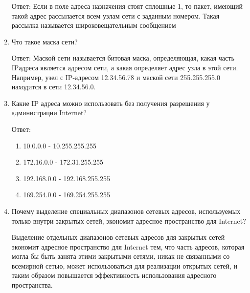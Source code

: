 \documentclass[bachelor, och, labwork]{shiza}
\begin{document}
\begin{enumerate}
        Ответ: Если в поле адреса назначения стоят сплошные 1, то пакет, имеющий такой адрес рассылается всем узлам сети с заданным номером. Такая рассылка
        называется широковещательным сообщением

        \item Что такое маска сети?

        Ответ: Маской сети называется битовая маска, определяющая, какая часть IPадреса является адресом сети, а какая определяет адрес узла в этой сети.
        Например, узел с IP-адресом 12.34.56.78 и маской сети 255.255.255.0 находится в сети 12.34.56.0.

       \item Какие IP адреса можно использовать без получения разрешения у администрации Internet?
        
       Ответ:

            \begin{enumerate}
                \item 10.0.0.0 - 10.255.255.255
                \item 172.16.0.0 - 172.31.255.255
                \item 192.168.0.0 - 192.168.255.255
                \item 169.254.0.0 - 169.254.255.255
            \end{enumerate}

       \item Почему выделение специальных диапазонов сетевых адресов, используемых только внутри закрытых сетей, экономит адресное пространство для
       Internet?
       
       Выделение отдельных диапазонов сетевых адресов для закрытых сетей экономит адресное пространство для Internet тем, что часть адресов, которая 
       могла бы быть занята этими закрытыми сетями, никак не связанными со всемирной сетью, может использоваться для реализации открытых сетей, и таким 
       образом повышается эффективность использования адресного пространства.
       
    \end{enumerate}
\end{document}
